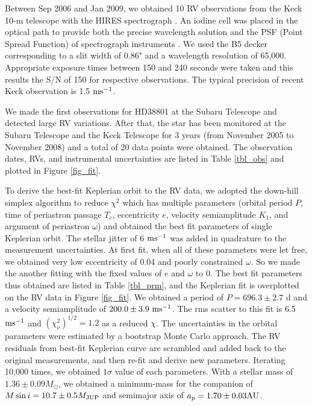 \documentclass[manuscript]{aastex}
\newcommand{\msini}{M \sin i}
\newcommand{\mjup}{M_{\rm JUP}}
\newcommand{\mps}{{\rm ms}^{-1}}
\begin{document}
Between Sep 2006 and Jan 2009, we obtained 10 RV observations from the Keck 10-m telescope with the HIRES spectrograph \citep{1994SPIE.2198..362V}.
An iodine cell was placed in the optical path to provide both the precise wavelength solution and the PSF (Point Spread Function) of spectrograph instruments 
\citep{1992PASP..104..270M,1996PASP..108..500B}. We used the B5 decker corresponding to a slit width 
of 0.86" and a wavelength resolution of 65,000. Appropriate exposure times between 150 and 240 seconds 
were taken and this results the S/N of 150 for respective observations. The typical precision of recent 
Keck observation is 1.5 $\mps$.

We made the first observations for HD38801 at the Subaru Telescope and detected large RV variations.
After that, the star has been monitored at the Subaru Telescope and the Keck Telescope for 3 years (from November 2005 to November 2008) 
and a total of 20 data points were obtained. The observation dates, RVs, and instrumental uncertainties 
are listed in Table \ref{tbl_obs} and plotted in Figure \ref{fig_fit}.

To derive the best-fit Keplerian orbit to the RV data, we adopted the down-hill simplex algorithm 
\citep[AMOEBA;][]{1965CJ..7.308} to reduce $\chi^2$ which has multiple parameters (orbital period $P$, 
time of periastron passage $T_c$, eccentricity $e$, velocity semiamplitude $K_1$, and argument of 
periastron $\omega$) and obtained the best fit parameters of single Keplerian orbit.
The stellar jitter of 6 $\mps$ was added in quadrature to the measurement uncertainties.
At first fit, when all of these parameters were let free, we obtained very low eccentricity of 0.04 and 
poorly constrained $\omega$. So we made the another fitting with the fixed values of $e$ and $\omega$ to 0.
The best fit parameters thus obtained are listed in Table \ref{tbl_prm}, and the Keplerian fit is overplotted 
on the RV data in Figure \ref{fig_fit}. We obtained a period of $P=696.3\pm2.7$ d and a velocity semiamplitude 
of $200.0\pm3.9\ \mps$. The rms scatter to this fit is 6.5 $\mps$ and 
$\left( \chi_{\nu}^2\right)^{1/2}=1.2$ as a reduced $\chi$. The uncertainties in the orbital parameters 
were estimated by a bootstrap Monte Carlo approach. The RV residuals from best-fit Keplerian curve are 
scrambled and added back to the original measurements, and then re-fit and derive new parameters.
Iterating 10,000 times, we obtained $1\sigma$ value of each parameters.
With a stellar mass of $1.36\pm0.09M_{\odot}$, we obtained a minimum-mass for the companion of 
$\msini = 10.7\pm0.5\mjup$ and semimajor axis of $a_{p} = 1.70\pm0.03 {\rm AU}$.
\end{document}
